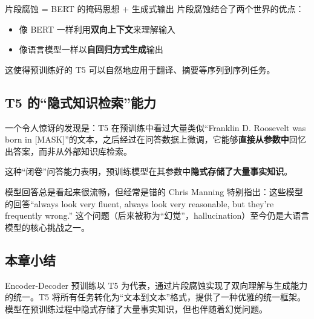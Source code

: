 \begin{importantbox}{片段腐蚀 = BERT 的掩码思想 + 生成式输出}
片段腐蚀结合了两个世界的优点：
\begin{itemize}
    \item 像 BERT 一样利用\textbf{双向上下文}来理解输入
    \item 像语言模型一样以\textbf{自回归方式生成}输出
\end{itemize}
这使得预训练好的 T5 可以自然地应用于翻译、摘要等序列到序列任务。
\end{importantbox}

\subsection{T5 的``隐式知识检索''能力}

一个令人惊讶的发现是：T5 在预训练中看过大量类似``Franklin D. Roosevelt was born in [MASK]''的文本，之后经过在问答数据上微调，它能够\textbf{直接从参数中}回忆出答案，而非从外部知识库检索。

这种``闭卷''问答能力表明，预训练模型在其参数中\textbf{隐式存储了大量事实知识}。

\begin{warningbox}{模型回答总是看起来很流畅，但经常是错的}
Chris Manning 特别指出：这些模型的回答``always look very fluent, always look very reasonable, but they're frequently wrong.'' 这个问题（后来被称为``幻觉''，hallucination）至今仍是大语言模型的核心挑战之一。
\end{warningbox}

\subsection{本章小结}

Encoder-Decoder 预训练以 T5 为代表，通过片段腐蚀实现了双向理解与生成能力的统一。T5 将所有任务转化为``文本到文本''格式，提供了一种优雅的统一框架。模型在预训练过程中隐式存储了大量事实知识，但也伴随着幻觉问题。


